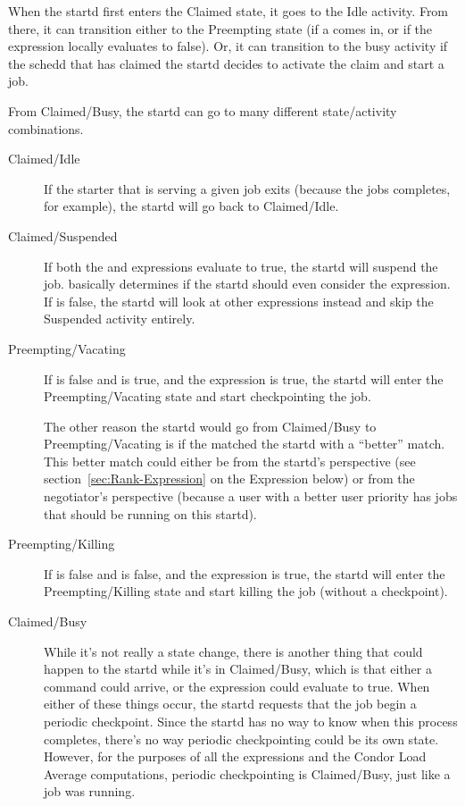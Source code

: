 When the startd first enters the Claimed state, it goes to the Idle
activity.  From there, it can transition either to the Preempting
state (if a  comes in, or if the 
expression locally evaluates to false).  Or, it can transition to the
busy activity if the schedd that has claimed the startd decides to
activate the claim and start a job.

From Claimed/Busy, the startd can go to many different state/activity
combinations.

\begin{description}
  
\item[Claimed/Idle] If the starter that is serving a given job exits
  (because the jobs completes, for example), the startd will go back
  to Claimed/Idle.
  
\item[Claimed/Suspended] If both the  and
   expressions evaluate to true, the startd will suspend
  the job.   basically determines if the startd
  should even consider the  expression.  If
   is false, the startd will look at other
  expressions instead and skip the Suspended activity entirely.
  
\item[Preempting/Vacating] If  is false and
   is true, and the  expression is
  true, the startd will enter the Preempting/Vacating state and start
  checkpointing the job.
  
  The other reason the startd would go from Claimed/Busy to
  Preempting/Vacating is if the  matched the startd
  with a ``better'' match.  This better match could either be from the
  startd's perspective (see section~\ref{sec:Rank-Expression} on the
   Expression below) or from the negotiator's perspective
  (because a user with a better user priority has jobs that should be
  running on this startd).
  
\item[Preempting/Killing] If  is false and
   is false, and the  expression is
  true, the startd will enter the Preempting/Killing state and start
  killing the job (without a checkpoint).
  
\item[Claimed/Busy] While it's not really a state change, there is
  another thing that could happen to the startd while it's in
  Claimed/Busy, which is that either a  command
  could arrive, or the  expression could
  evaluate to true.  When either of these things occur, the startd
  requests that the job begin a periodic checkpoint.  Since the startd
  has no way to know when this process completes, there's no way
  periodic checkpointing could be its own state.  However, for the
  purposes of all the expressions and the Condor Load Average
  computations, periodic checkpointing is Claimed/Busy, just like a
  job was running.

\end{description}

